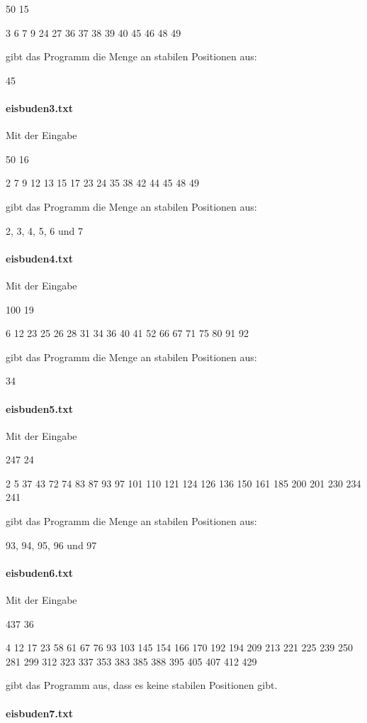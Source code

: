 \documentclass[a4paper,10pt,ngerman]{scrartcl}
\begin{document}
50 15

3 6 7 9 24 27 36 37 38 39 40 45 46 48 49

gibt das Programm die Menge an stabilen Positionen aus:

45

\paragraph{eisbuden3.txt}
Mit der Eingabe

50 16

2 7 9 12 13 15 17 23 24 35 38 42 44 45 48 49

gibt das Programm die Menge an stabilen Positionen aus:

2, 3, 4, 5, 6 und 7

\paragraph{eisbuden4.txt}
Mit der Eingabe

100 19

6 12 23 25 26 28 31 34 36 40 41 52 66 67 71 75 80 91 92

gibt das Programm die Menge an stabilen Positionen aus:

34

\paragraph{eisbuden5.txt}
Mit der Eingabe

247 24

2 5 37 43 72 74 83 87 93 97 101 110 121 124 126 136 150 161 185 200 201 230 234 241

gibt das Programm die Menge an stabilen Positionen aus:

93, 94, 95, 96 und 97

\paragraph{eisbuden6.txt}
Mit der Eingabe

437 36

4 12 17 23 58 61 67 76 93 103 145 154 166 170 192 194 209 213 221 225 239 250 281 299 312 323 337 353 383 385 388 395 405 407 412 429

gibt das Programm aus, dass es keine stabilen Positionen gibt.

\paragraph{eisbuden7.txt}
\end{document}
